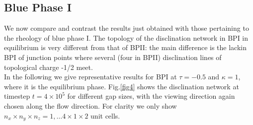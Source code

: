 \documentclass[12pt,twoside]{iopart}
\newcommand{\ex}[1]{\times10^{#1}}
\begin{document}
\subsection{Blue Phase I}\label{sec_bpi}

We now compare and contrast the results just obtained with those pertaining to the rheology of blue phase I. The topology of the disclination network in BPI in equilibrium is very different from that of BPII: the main difference is the lackin BPI of junction points where several (four in BPII) disclination lines of topological charge -1/2 meet. \\
In the following we give representative results for BPI at $\tau=-0.5$ and $\kappa=1$, where it is the equilibrium phase.
Fig.\ref{fig4} shows the disclination network at timestep $t=4\ex{5}$ for different gap sizes, with the viewing direction again chosen along the flow direction.
For clarity we only show $n_x \times n_y \times n_z=1,\dots4\times1\times2$ unit cells.
\end{document}
